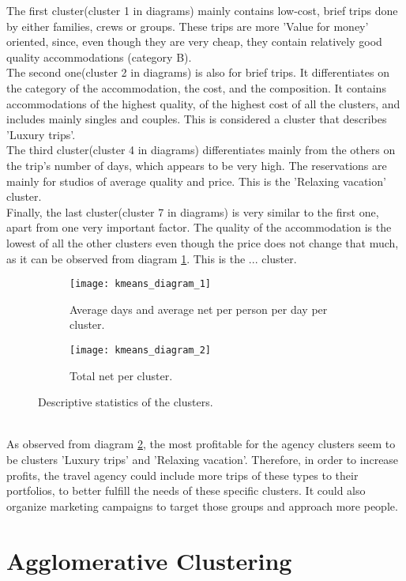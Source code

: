 The first cluster(cluster 1 in diagrams) mainly contains low-cost, brief trips done by either families, crews or groups. These trips are more 'Value for money' oriented, since, even though they are very cheap, they contain relatively good quality accommodations (category B). \\
The second one(cluster 2 in diagrams) is also for brief trips. It differentiates on the category of the accommodation, the cost, and the composition. It contains accommodations of the highest quality, of the highest cost of all the clusters, and includes mainly singles and couples. This is considered a cluster that describes 'Luxury trips'. \\
The third cluster(cluster 4 in diagrams) differentiates mainly from the others on the trip's number of days, which appears to be very high. The reservations are mainly for studios of average quality and price. This is the 'Relaxing vacation' cluster. \\
Finally, the last cluster(cluster 7 in diagrams) is very similar to the first one, apart from one very important factor. The quality of the accommodation is the lowest of all the other clusters even though the price does not change that much, as it can be observed from diagram \ref{fig:kmeans1}. This is the ... cluster.
\begin{figure}[ht]
\centering
\begin{subfigure}{.5\textwidth}
\centering
\texttt{[image: kmeans\_diagram\_1]}
\caption{Average days and average net per person per day per cluster.}
\label{fig:kmeans1}
\end{subfigure}%
\begin{subfigure}{.5\textwidth}
\centering
\texttt{[image: kmeans\_diagram\_2]}
\caption{Total net per cluster.}
\label{fig:kmeans2}
\end{subfigure}%
\caption{Descriptive statistics of the clusters.}
\label{fig:methods}
\end{figure}
\\
As observed from diagram \ref{fig:kmeans2}, the most profitable for the agency clusters seem to be clusters 'Luxury trips' and 'Relaxing vacation'. Therefore, in order to increase profits, the travel agency could include more trips of these types to their portfolios, to better fulfill the needs of these specific clusters. It could also organize marketing campaigns to target those groups and approach more people.
\section{Agglomerative Clustering}
